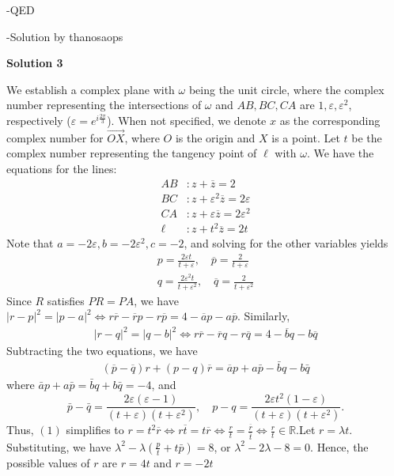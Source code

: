 \begin{enumerate}
 
-QED

 
-Solution by thanosaops

 



\textbf{Solution 3}

We establish a complex plane with $\omega$ being the unit circle, where the complex number representing the intersections of $\omega$ and $AB, BC, CA$ are $1,\varepsilon,\varepsilon^2$, respectively ($\varepsilon=e^{i\frac{2\pi}{3}}$). When not specified, we denote $x$ as the corresponding complex number for $\overrightarrow{OX}$, where $O$ is the origin and $X$ is a point. Let $t$ be the complex number representing the tangency point of $\ell$ with $\omega$. We have the equations for the lines:\begin{align*}AB&: z+\overline z = 2\\BC&: z+\varepsilon^2\overline z=2\varepsilon\\CA&: z+\varepsilon\overline z=2\varepsilon^2\\\ell&: z+t^2\overline z=2t\end{align*}
Note that $a=-2\varepsilon, b=-2\varepsilon^2, c=-2$, and solving for the other variables yields\begin{gather*}p=\frac{2\varepsilon t}{t+\varepsilon},\quad\overline p=\frac{2}{t+\varepsilon}\\q=\frac{2\varepsilon^2t}{t+\varepsilon^2},\quad\overline q=\frac{2}{t+\varepsilon^2}\end{gather*}Since $R$ satisfies $PR=PA$, we have $\lvert r-p\rvert^2=\lvert p-a\rvert^2\iff r\overline r-\overline rp-r\overline p=4-\overline ap-a\overline p$. Similarly,\begin{align*}\lvert r-q\rvert^2=\lvert q-b\rvert^2\iff r\overline r-\overline rq-r\overline q=4-\overline bq-b\overline q\end{align*}
Subtracting the two equations, we have\begin{align*}(\overline p-\overline q)r+(p-q)\overline r=\overline ap+a\bar p-\bar bq-b\bar q\tag{1}\end{align*}
where $\bar ap+a\bar p=\bar bq+b\bar q=-4$, and
 \[\bar p-\bar q=\frac{2\varepsilon(\varepsilon-1)}{(t+\varepsilon)(t+\varepsilon^2)},\quad p-q=\frac{2\varepsilon t^2(1-\varepsilon)}{(t+\varepsilon)(t+\varepsilon^2)}.\]Thus, $(1)$ simplifies to $r=t^2\overline r\iff r\overline t=t\overline r\iff\frac{r}{t}=\frac{\overline r}{\bar t}\iff\frac{r}{t}\in\mathbb{R}$.Let $r=\lambda t$. Substituting, we have $\lambda^2-\lambda(\frac{p}{t}+t\bar p)=8$, or $\lambda^2-2\lambda-8=0$. Hence, the possible values of $r$ are $r=4t$ and $r=-2t$


\end{enumerate}

